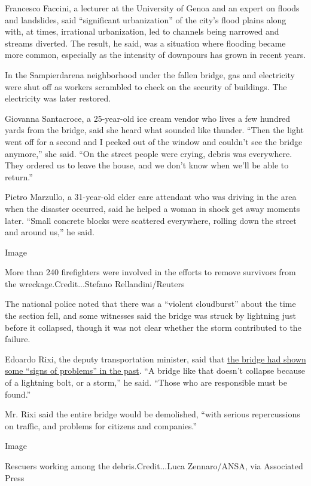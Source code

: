 Francesco Faccini, a lecturer at the University of Genoa and an expert
on floods and landslides, said ``significant urbanization'' of the
city's flood plains along with, at times, irrational urbanization, led
to channels being narrowed and streams diverted. The result, he said,
was a situation where flooding became more common, especially as the
intensity of downpours has grown in recent years.

In the Sampierdarena neighborhood under the fallen bridge, gas and
electricity were shut off as workers scrambled to check on the security
of buildings. The electricity was later restored.

Giovanna Santacroce, a 25-year-old ice cream vendor who lives a few
hundred yards from the bridge, said she heard what sounded like thunder.
``Then the light went off for a second and I peeked out of the window
and couldn't see the bridge anymore,'' she said. ``On the street people
were crying, debris was everywhere. They ordered us to leave the house,
and we don't know when we'll be able to return.''

Pietro Marzullo, a 31-year-old elder care attendant who was driving in
the area when the disaster occurred, said he helped a woman in shock get
away moments later. ``Small concrete blocks were scattered everywhere,
rolling down the street and around us,'' he said.

Image

More than 240 firefighters were involved in the efforts to remove
survivors from the wreckage.Credit...Stefano Rellandini/Reuters

The national police noted that there was a ``violent cloudburst'' about
the time the section fell, and some witnesses said the bridge was struck
by lightning just before it collapsed, though it was not clear whether
the storm contributed to the failure.

Edoardo Rixi, the deputy transportation minister, said that
\href{https://www.nytimes.com/2018/08/15/world/europe/italy-genoa-bridge-collapse.html}{the
bridge had shown some ``signs of problems'' in the past}. ``A bridge
like that doesn't collapse because of a lightning bolt, or a storm,'' he
said. ``Those who are responsible must be found.''

Mr. Rixi said the entire bridge would be demolished, ``with serious
repercussions on traffic, and problems for citizens and companies.''

Image

Rescuers working among the debris.Credit...Luca Zennaro/ANSA, via
Associated Press

